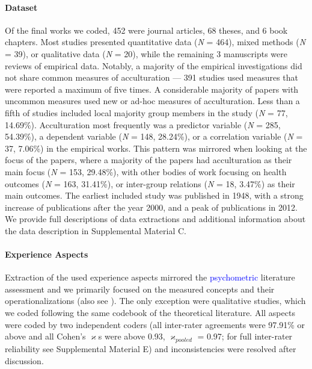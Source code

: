 \paragraph{Dataset}

Of the final works we coded, 452 were journal articles, 68 theses, and 6
book chapters. Most studies presented quantitative data (\textit{N} =
464), mixed methods (\textit{N} = 39), or qualitative data (\textit{N} =
20), while the remaining 3 manuscripts were reviews of empirical data.
Notably, a majority of the empirical investigations did not share common
measures of acculturation --- 391 studies used measures that were
reported a maximum of five times. A considerable majority of papers with
uncommon measures used new or ad-hoc measures of acculturation. Less
than a fifth of studies included local majority group members in the
study (\textit{N} = 77, 14.69\%). Acculturation most frequently was a
predictor variable (\textit{N} = 285, 54.39\%), a dependent variable
(\textit{N} = 148, 28.24\%), or a correlation variable (\textit{N} = 37,
7.06\%) in the empirical works. This pattern was mirrored when looking
at the focus of the papers, where a majority of the papers had
acculturation as their main focus (\textit{N} = 153, 29.48\%), with
other bodies of work focusing on health outcomes (\textit{N} = 163,
31.41\%), or inter-group relations (\textit{N} = 18, 3.47\%) as their
main outcomes. The earliest included study was published in 1948, with a
strong increase of publications after the year 2000, and a peak of
publications in 2012. We provide full descriptions of data extractions
and additional information about the data description in Supplemental
Material C.

\paragraph{Experience Aspects}

Extraction of the used experience aspects mirrored the
\textcolor{blue}{psychometric} literature assessment and we primarily
focused on the measured concepts and their operationalizations (also see
). The only exception were qualitative
studies, which we coded following the same codebook of the theoretical
literature. All aspects were coded by two independent coders (all
inter-rater agreements were 97.91\% or above and all Cohen's
\(\varkappa\)s were above 0.93, \(\varkappa_{pooled}\) = 0.97; for full
inter-rater reliability see Supplemental Material E) and inconsistencies
were resolved after discussion.

